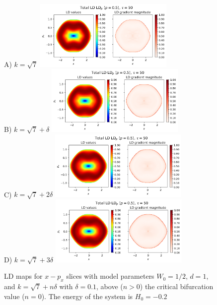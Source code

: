 \documentclass[10pt,aps,onecolumn,superscriptaddress]{revtex4-2}
\begin{document}
\begin{figure}
    \centering
    A) $k = \sqrt{7}$ \includegraphics[width=0.6\textwidth]{LD_H0_-0_2_x-px_PES_bifurcation_n_0.png}\\
    B) $k = \sqrt{7} + \delta$ \includegraphics[width=0.6\textwidth]{LD_H0_-0_2_x-px_PES_bifurcation_n_1.png}\\
    C) $k = \sqrt{7} + 2 \delta$ \includegraphics[width=0.6\textwidth]{LD_H0_-0_2_x-px_PES_bifurcation_n_2.png}\\
    D) $k = \sqrt{7} + 3 \delta$ \includegraphics[width=0.6\textwidth]{LD_H0_-0_2_x-px_PES_bifurcation_n_3.png}\\
    \caption{LD maps for $x-p_x$ slices with model parameters $W_0 = 1/2$, $d = 1$, and $k = \sqrt{7} + n \delta$ with $\delta = 0.1$, above ($n > 0$) the critical bifurcation value ($n = 0$). The energy of the system is $H_0 = -0.2$}
\end{figure}
\end{document}
